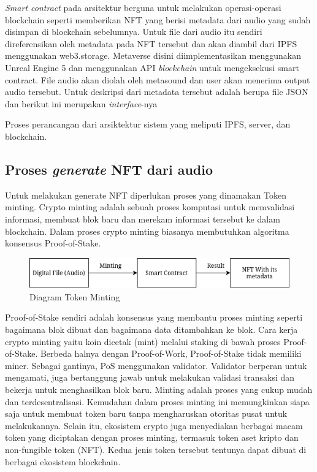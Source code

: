 \emph{Smart contract} pada arsitektur berguna untuk melakukan operasi-operasi blockchain seperti
memberikan NFT yang berisi metadata dari audio yang sudah disimpan di blockchain sebelumnya.
Untuk file dari audio itu sendiri direferensikan oleh metadata pada NFT tersebut dan akan diambil dari
IPFS menggunakan web3.storage. Metaverse disini diimplementasikan menggunakan Unreal Engine 5 dan menggunakan API
\emph{blockchain} untuk mengeksekusi smart contract. File audio akan diolah oleh metasound dan user akan menerima output audio tersebut.
Untuk deskripsi dari metadata tersebut adalah berupa file JSON dan berikut ini merupakan \emph{interface}-nya


Proses perancangan dari arsiktektur sistem yang meliputi IPFS, server, dan blockchain.

\subsection{Proses \emph{generate} NFT dari audio}

Untuk melakukan generate NFT diperlukan proses yang dinamakan Token minting.
Crypto minting adalah sebuah proses komputasi untuk memvalidasi informasi, membuat blok baru dan merekam informasi tersebut ke dalam blockchain.
Dalam proses crypto minting biasanya membutuhkan algoritma konsensus Proof-of-Stake.

\begin{figure} [ht] \centering
  \includegraphics[scale=0.55]{gambar/mintingtoken.png}
  \caption{Diagram Token Minting}
  \label{fig:mintingtoken}
\end{figure}

Proof-of-Stake sendiri adalah konsensus yang membantu proses minting seperti bagaimana blok dibuat dan bagaimana data ditambahkan ke blok. Cara kerja crypto minting yaitu koin dicetak (mint) melalui staking di bawah proses Proof-of-Stake. Berbeda halnya dengan Proof-of-Work, Proof-of-Stake tidak memiliki miner. Sebagai gantinya, PoS menggunakan validator. Validator berperan untuk mengamati, juga bertanggung jawab untuk melakukan validasi transaksi dan bekerja untuk menghasilkan blok baru.
Minting adalah proses yang cukup mudah dan terdesentralisasi. Kemudahan dalam proses  minting ini memungkinkan siapa saja untuk membuat token baru tanpa mengharuskan otoritas pusat untuk melakukannya.
Selain itu, ekosistem crypto juga menyediakan berbagai macam token yang diciptakan dengan proses minting, termasuk token aset kripto dan non-fungible token (NFT). Kedua jenis token tersebut tentunya dapat dibuat di berbagai ekosistem blockchain.

